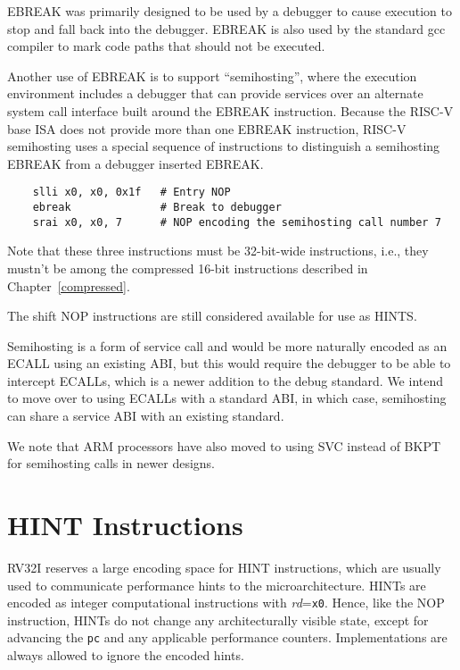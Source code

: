 \begin{commentary}
  EBREAK was primarily designed to be used by a debugger to cause
  execution to stop and fall back into the debugger. EBREAK is also
  used by the standard gcc compiler to mark code paths that should not
  be executed.

  Another use of EBREAK is to support ``semihosting'', where the
  execution environment includes a debugger that can provide services
  over an alternate system call interface built around the EBREAK
  instruction.  Because the RISC-V base ISA does not provide more than
  one EBREAK instruction, RISC-V semihosting uses a special sequence of
  instructions to distinguish a semihosting EBREAK from a debugger
  inserted EBREAK.
\begin{verbatim}
    slli x0, x0, 0x1f   # Entry NOP
    ebreak              # Break to debugger
    srai x0, x0, 7      # NOP encoding the semihosting call number 7
\end{verbatim}
   Note that these three instructions must be 32-bit-wide instructions,
   i.e., they mustn't be among the compressed 16-bit instructions
   described in Chapter~\ref{compressed}.

   The shift NOP instructions are still considered available for use as
   HINTS.

   Semihosting is a form of service call and would be more naturally
   encoded as an ECALL using an existing ABI, but this would require
   the debugger to be able to intercept ECALLs, which is a newer
   addition to the debug standard.  We intend to move over to using
   ECALLs with a standard ABI, in which case, semihosting can share a
   service ABI with an existing standard.

   We note that ARM processors have also moved to using SVC instead of
   BKPT for semihosting calls in newer designs.
\end{commentary}

\begin{formalspec}
  \sailfclECALLexecute
  \sailfclEBREAKexecute
\end{formalspec}

\section{HINT Instructions}
\label{sec:rv32i-hints}

RV32I reserves a large encoding space for HINT instructions, which are
usually used to communicate performance hints to the
microarchitecture.  HINTs are encoded as integer computational
instructions with {\em rd}={\tt x0}.  Hence, like the NOP instruction,
HINTs do not change any architecturally visible state, except for
advancing the {\tt pc} and any applicable performance counters.
Implementations are always allowed to ignore the encoded hints.

